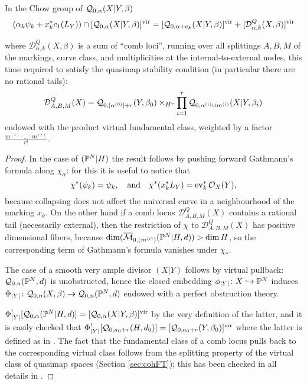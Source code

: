 \begin{prop}\label{prop:quasimap_Gathmann_formula} In the Chow group of $\mathcal{Q}_{0,\alpha}(X|Y,\beta)$
 \begin{equation*} (\alpha_k \psi_k + x_k^*c_1(L_Y)) \cap [\mathcal{Q}_{0,\alpha}(X|Y,\beta)]^{\mathrm{vir}} = [\mathcal{Q}_{0,\alpha+e_k}(X|Y,\beta)]^{\mathrm{vir}} + [\mathcal{D}^Q_{\alpha,k}(X,\beta)]^{\mathrm{vir}} \end{equation*}
\end{prop}
\noindent where $\mathcal{D}^Q_{\alpha,k}(X,\beta)$ is a sum of ``comb loci'', running over all splittings $A,B,M$ of the markings, curve class, and multiplicities at the internal-to-external nodes, this time required to satisfy the quasimap stability condition (in particular there are no rational tails):
\[\mathcal{D}^Q_{A,B,M}(X)=\mathcal{Q}_{0,\lvert\alpha^{(0)}\rvert+r}(Y,\beta_0)\times_{H^r}\prod_{i=1}^r
\mathcal{Q}_{0,\alpha^{(i)}\cup m^{(i)}}(X|Y,\beta_i)\]
endowed with the product virtual fundamental class, weighted by a factor $\frac{m^{(1)}\cdot\ldots\cdot m^{(r)}}{r!}$.
\begin{proof}
 In the case of $(\mathbb P^N|H)$ the result follows by pushing forward Gathmann's formula along $\chi_\alpha$: for this it is useful to notice that
 \begin{equation}
  \chi^*(\psi_k)=\psi_k, \quad \text{and} \quad \chi^*(x_k^*L_Y)=\operatorname{ev}_k^*\mathcal{O}_X(Y),
 \end{equation}
because collapsing does not affect the universal curve in a neighbourhood of the marking $x_k$. On the other hand if a comb locus $\mathcal{D}^Q_{A,B,M}(X)$ contains a rational tail (necessarily external), then the restriction of $\chi$ to $\mathcal{D}^Q_{A,B,M}(X)$ has positive dimensional fibers, because $\dim(\overline{\mathcal{M}}_{0,(m^{(i)})}(\mathbb P^N|H,d))>\dim H$, so the corresponding term of Gathmann's formula vanishes under $\chi_*$.

The case of a smooth very ample divisor $(X|Y)$ follows by virtual pullback: $\mathcal{Q}_{0,n}(\mathbb P^N,d)$ is unobstructed, hence the  closed embedding $\phi_{\lvert Y\rvert}\colon X\hookrightarrow \mathbb P^N$ induces $\Phi_{\lvert Y\rvert}\colon \mathcal{Q}_{0,n}(X,\beta)\rightarrow \mathcal{Q}_{0,n}(\mathbb P^N,d)$ endowed with a perfect obstruction theory.

$\Phi_{\lvert Y\rvert}^![\mathcal{Q}_{0,\alpha}(\mathbb P^N|H,d)]=[\mathcal{Q}_{0,\alpha}(X|Y,\beta)]^{\mathrm{vir}}$ by the very definition of the latter, and it is easily checked that $\Phi_{\lvert Y\rvert}^![\mathcal{Q}_{0,a_0+r}(H,d_0)]=[\mathcal{Q}_{0,a_0+r}(Y,\beta_0)]^{\mathrm{vir}}$ where the latter is defined as in \cite{CFKM}. The fact that the fundamental class of a comb locus pulls back to the corresponding virtual class follows from the splitting property of the virtual class of quasimap spaces (Section \ref{sec:cohFT}); this has been checked in all details in \cite[\S 4 and Appendix B.4]{BN}.
\end{proof}

